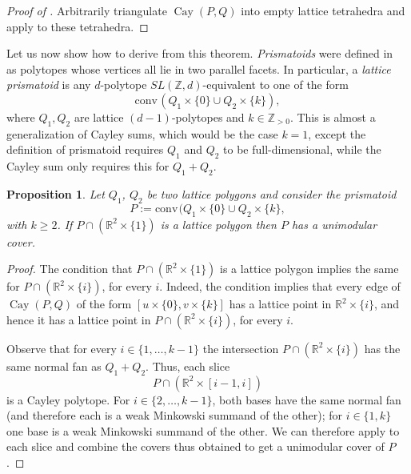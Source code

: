 \documentclass{amsart}
\theoremstyle{plain}
\newtheorem{proposition}[theorem]{Proposition}
\theoremstyle{definition}
\newcommand{\Z}{ \ensuremath{\mathbb{Z}}}
\newcommand{\R}{ \ensuremath{\mathbb{R}}}
\newcommand{\conv}{\ensuremath{\mathrm{conv}}\hspace{1pt}}
\newcommand{\cayley}{\operatorname{Cay}}
\begin{document}
\begin{proof}[Proof of ]
Arbitrarily triangulate $\cayley(P,Q)$ into empty lattice tetrahedra and apply  to these tetrahedra.
\end{proof}

Let us now show how to derive  from this theorem.
\emph{Prismatoids} were defined in~\cite{Santos-hirsch} as polytopes whose vertices all lie in two parallel facets. In particular, a \emph{lattice prismatoid} is any $d$-polytope $SL(\Z,d)$-equivalent to one of the form
\[
\conv(Q_1\times\{0\} \cup Q_2 \times \{k\}),
\]
where $Q_1,Q_2$ are lattice $(d-1)$-polytopes and $k\in \Z_{>0}$. This is almost a generalization of Cayley sums, which would be the case $k=1$, except the definition of prismatoid requires $Q_1$ and $Q_2$ to be full-dimensional, while the Cayley sum only requires this for $Q_1+Q_2$.

\begin{proposition}
\label{prop:prismatoid}
Let $Q_1$, $Q_2$ be two lattice polygons and consider the prismatoid 
\[
P:= \conv(Q_1\times\{0\} \cup Q_2 \times \{k\},
\]
with $k\ge 2$. 
If $P\cap(\R^2\times\{1\})$ is a lattice polygon then $P$ has a unimodular cover.
\end{proposition}

\begin{proof}
The condition that $P\cap(\R^2\times\{1\})$ is a lattice polygon implies the same for $P\cap(\R^2\times\{i\})$, for every $i$. 
Indeed, the condition implies that every edge of $\cayley(P,Q)$ of the form $[u\times \{0\}, v\times \{k\}]$ has a lattice point in $\R^2\times\{i\}$, and hence it has a lattice point in $P\cap(\R^2\times\{i\})$, for every $i$.

Observe that for every $i\in \{1,\dots,k-1\}$ the intersection $P\cap(\R^2\times\{i\})$ has the same normal fan as $Q_1+Q_2$. Thus, each slice
\[
P \cap (\R^2\times[i-1,i])
\]
is a Cayley polytope. For $i\in\{2,\dots,k-1\}$,  both bases have the same normal fan (and therefore each is a weak Minkowski summand of the other); for $i\in \{1,k\}$ one base is a weak Minkowski summand of the other. We can therefore apply  to each slice and combine the covers thus obtained to get a unimodular cover of $P$.
\end{proof}
\end{document}
